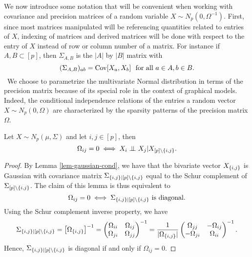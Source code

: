 We now introduce some notation that will be convenient when working with covariance and precision matrices of a random variable $X \sim N_p(0, \Omega^{-1})$. First, since most matrices manipulated will be referencing quantities related to entries of $X$, indexing of matrices and derived matrices will be done with respect to the entry of $X$ instead of row or column number of a matrix. For instance if $A, B \subset [p]$, then $\Sigma_{A, B}$ is the $|A|$ by $|B|$ matrix with
\begin{equation*}
    (\Sigma_{A, B})_{ab} = {\textrm{Cov}}[X_a, X_b] \ \ \textrm{for all } a \in A, b \in B.
\end{equation*}
\
We choose to parametrize the multivariate Normal distribution in terms of the precision matrix because of its special role in the context of graphical models. Indeed, the conditional independence relations of the entries a random vector $X \sim N_p(0, \Omega)$ are characterized by the sparsity patterns of the precision matrix $\Omega$.
\
\begin{lemma}
    Let $X \sim N_p(\mu, \Sigma)$ and let $i, j \in [p]$, then
    \begin{equation*}
        \Omega_{ij} = 0 \iff X_i \perp\mkern-9.5mu\perp X_j | X_{[p] \setminus {\left\{i,j\right\}}}.
    \end{equation*}
\end{lemma}
\begin{proof}
    By Lemma \ref{lem-gaussian-cond}, we have that the bivariate vector $X_{{\left\{i,j\right\}}}$ is Gaussian with covariance matrix $\Sigma_{{\left\{i,j\right\}}|[p]\setminus{\left\{i,j\right\}}}$ equal to the Schur complement of $\Sigma_{[p] \setminus {\left\{i,j\right\}}}$. The claim of this lemma is thus equivalent to 
    \begin{equation*}
        \Omega_{ij} = 0 \iff \Sigma_{{\left\{i,j\right\}}|[p]\setminus{\left\{i,j\right\}}}\ \textrm{is diagonal}.
    \end{equation*}
    Using the Schur complement inverse property, we have 
    \begin{equation*}
        \Sigma_{{\left\{i,j\right\}}|[p]\setminus{\left\{i,j\right\}}} 
        = \left[\Omega_{{\left\{i,j\right\}}}\right]^{-1} 
        = \begin{pmatrix}
            \Omega_{ii} & \Omega_{ij}\\
            \Omega_{ji} & \Omega_{jj}
            \end{pmatrix}^{-1}
        = \frac{1}{|\Omega_{{\left\{i,j\right\}}}|} \begin{pmatrix}
            \Omega_{jj} & -\Omega_{ij}\\
            -\Omega_{ji} & \Omega_{ii} 
            \end{pmatrix}^{-1}.
    \end{equation*}
    Hence, $\Sigma_{{\left\{i,j\right\}}|[p]\setminus{\left\{i,j\right\}}}$ is diagonal if and only if $\Omega_{ij} = 0$.
\end{proof}

